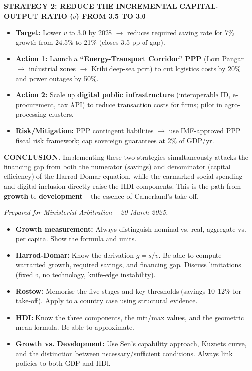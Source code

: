 \documentclass[11pt]{article}
\begin{document}
\begin{exemplebox}
\vspace{0.2cm}
\noindent\textbf{STRATEGY 2: REDUCE THE INCREMENTAL CAPITAL-OUTPUT RATIO ($v$) FROM 3.5 TO 3.0}
\begin{itemize}
    \item \textbf{Target:} Lower $v$ to 3.0 by 2028 $\rightarrow$ reduces required saving rate for 7\% growth from 24.5\% to 21\% (closes 3.5 pp of gap).
    \item \textbf{Action 1:} Launch a \textbf{``Energy-Transport Corridor'' PPP} (Lom Pangar $\rightarrow$ industrial zones $\rightarrow$ Kribi deep-sea port) to cut logistics costs by 20\% and power outages by 50\%.
    \item \textbf{Action 2:} Scale up \textbf{digital public infrastructure} (interoperable ID, e-procurement, tax API) to reduce transaction costs for firms; pilot in agro-processing clusters.
    \item \textbf{Risk/Mitigation:} PPP contingent liabilities $\rightarrow$ use IMF-approved PPP fiscal risk framework; cap sovereign guarantees at 2\% of GDP/yr.
\end{itemize}

\vspace{0.3cm}
\noindent\textbf{CONCLUSION.} Implementing these two strategies simultaneously attacks the financing gap from both the numerator (savings) and denominator (capital efficiency) of the Harrod-Domar equation, while the earmarked social spending and digital inclusion directly raise the HDI components. This is the path from \textbf{growth} to \textbf{development} -- the essence of Camerland's take-off.

\vspace{0.2cm}
\noindent\textit{Prepared for Ministerial Arbitration -- 20 March 2025.}
\end{exemplebox}

\begin{aretenir}
\begin{itemize}
    \item \textbf{Growth measurement:} Always distinguish nominal vs. real, aggregate vs. per capita. Show the formula and units.
    \item \textbf{Harrod-Domar:} Know the derivation $g = s/v$. Be able to compute warranted growth, required savings, and financing gap. Discuss limitations (fixed $v$, no technology, knife-edge instability).
    \item \textbf{Rostow:} Memorise the five stages and key thresholds (savings 10--12\% for take-off). Apply to a country case using structural evidence.
    \item \textbf{HDI:} Know the three components, the min/max values, and the geometric mean formula. Be able to approximate.
    \item \textbf{Growth vs. Development:} Use Sen's capability approach, Kuznets curve, and the distinction between necessary/sufficient conditions. Always link policies to both GDP and HDI.
\end{itemize}
\end{aretenir}
\end{document}
